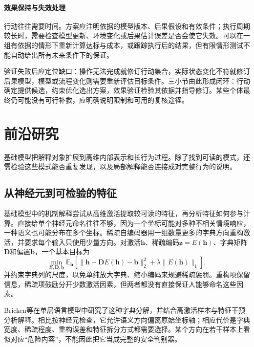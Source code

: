 \paragraph{效果保持与失效处理}

行动往往需要时间。方案应注明依据的模型版本、后果假设和有效条件；执行周期较长时，需要检查模型更新、环境变化或后果估计误差是否会使它失效。可以在一组有依据的情形下重新计算达标与成本，或跟踪执行后的结果，但有限情形测试不能自动给出所有未来条件下的保证。

验证失败后应定位缺口：操作无法完成就修订行动集合，实际状态变化不符就修订后果模型，模型或流程变化则需要重新评估目标条件。三小节由此形成闭环：行动确定提供候选，约束优化选出方案，效果验证检验其依据并指导修订。某些个体最终仍可能没有可行补救，应明确说明限制和可用的复核途径。

\section{前沿研究}
\label{sec:interpretability-frontiers}

基础模型把解释对象扩展到高维内部表示和长行为过程。除了找到可读的模式，还需检验这些模式能否重复发现，以及局部解释能否连接成对完整行为的说明。

\subsection{从神经元到可检验的特征}

基础模型中的机制解释尝试从高维激活提取较可读的特征，再分析特征如何参与计算。直接给单个神经元命名往往不够，因为一个坐标可能对多种不相关情境响应，一种语义也可能分布在多个坐标。稀疏自编码器用一组数量更多的字典方向重构激活，并要求每个输入只使用少量方向。对激活$\bm h$、稀疏编码$\bm z=E(\bm h)$、字典矩阵$\bm D$和偏置$\bm b$，一个基本目标为
\begin{equation}
 \min_{E,\bm D,\bm b}
 \mathbb E_{\bm h}\!\left[
 \|\bm h-\bm D E(\bm h)-\bm b\|_2^2
 +\lambda\|E(\bm h)\|_1\right],
 \label{eq:interpretability-sae}
\end{equation}
并约束字典列的尺度，以免单纯放大字典、缩小编码来规避稀疏惩罚。重构项保留信息，稀疏项鼓励分开少数激活因素，但两者都没有直接保证人能够命名这些因素。

Bricken等在单层语言模型中研究了这种字典分解，并结合高激活样本与特征干预分析解释。相比按神经元检查，它允许语义方向偏离原始坐标轴；相应代价是字典宽度、稀疏程度、重构误差和特征拆分方式都需要选择。某个方向在若干样本上看似对应“危险内容”，不能因此把它当成完整的安全判别器。

